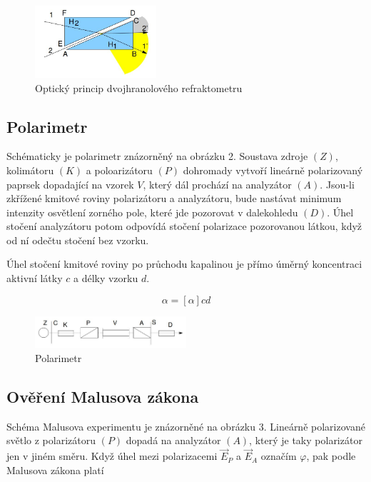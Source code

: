 \documentclass[a4paper,11pt]{article}
\begin{document}
\begin{figure}[htpb]
    \centering
    \includegraphics[width=0.4\textwidth]{refraktometr.jpg}
    \caption{Optický princip dvojhranolového refraktometru}
\end{figure}

\subsection{Polarimetr}

Schématicky je polarimetr znázorněný na obrázku 2. Soustava zdroje $ (Z) $, kolimátoru $ (K) $ a poloarizátoru $ (P) $ dohromady vytvoří lineárně polarizovaný paprsek dopadající na vzorek $ V $, který dál prochází na analyzátor $ (A) $. Jsou-li zkřížené kmitové roviny polarizátoru a analyzátoru, bude nastávat minimum intenzity osvětlení zorného pole, které jde pozorovat v dalekohledu $ (D) $. Úhel stočení analyzátoru potom odpovídá stočení polarizace pozorovanou látkou, když od ní odečtu stočení bez vzorku.

Úhel stočení kmitové roviny po průchodu kapalinou je přímo úměrný koncentraci aktivní látky $ c $ a délky vzorku $ d $. 

\begin{equation}
\alpha = [\alpha] cd
\end{equation}

\begin{figure}[htpb]
    \centering
    \includegraphics[width=0.5\textwidth]{polarimetr.jpg}
    \caption{Polarimetr}
\end{figure}

\subsection{Ověření Malusova zákona}

    Schéma Malusova experimentu je znázorněné na obrázku 3. Lineárně polarizované světlo z polarizátoru $ (P) $ dopadá na analyzátor $ (A) $, který je taky polarizátor jen v jiném směru. Když úhel mezi polarizacemi $ \vec{E}_P $ a $ \vec{E}_A $ označím $ \varphi $, pak podle Malusova zákona platí
\end{document}
